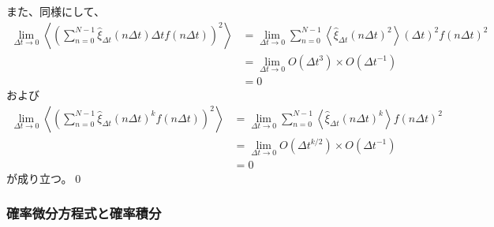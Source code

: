 \documentclass[a4paper,11pt]{jsarticle}
\numberwithin{equation}{section}
\begin{document}
また、同様にして、
\begin{align}
\lim_{\Delta t \to 0} 
\left\langle 
\left( \sum_{n=0}^{N-1} \hat{\xi}_{\Delta t}(n \Delta t) \Delta t f(n \Delta t) \right)^2 
\right\rangle 
&= \lim_{\Delta t \to 0} 
\sum_{n=0}^{N-1} 
\left\langle \hat{\xi}_{\Delta t}(n \Delta t)^2 \right\rangle 
(\Delta t)^2 f(n \Delta t)^2 \\
&= \lim_{\Delta t \to 0} 
O(\Delta t^3) \times O(\Delta t^{-1})  \\
&= 0 
\end{align}
および
\begin{align}
\lim_{\Delta t \to 0}
\left\langle
\left( \sum_{n=0}^{N-1} \hat{\xi}_{\Delta t}(n \Delta t)^k f(n \Delta t) \right)^2
\right\rangle
&= \lim_{\Delta t \to 0}
\sum_{n=0}^{N-1}
\left\langle \hat{\xi}_{\Delta t}(n \Delta t)^k \right\rangle f(n \Delta t)^2 \\
&= \lim_{\Delta t \to 0}
O(\Delta t^{k/2}) \times O(\Delta t^{-1}) \\
&= 0
\end{align}
が成り立つ。\qed\\

\subsubsection{確率微分方程式と確率積分}
\end{document}
